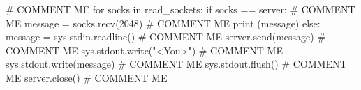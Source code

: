 \documentclass[paper=a4,fontsize=11pt]{scrartcl}%
\numberwithin{equation}{section}
\begin{document}
\begin{enumerate}
\begin{python}
 	# COMMENT ME 
    for socks in read_sockets:
        if socks == server: # COMMENT ME
            message = socks.recv(2048) # COMMENT ME
            print (message)
        else:
            message = sys.stdin.readline() # COMMENT ME
            server.send(message) # COMMENT ME
            sys.stdout.write("<You>") # COMMENT ME
            sys.stdout.write(message) # COMMENT ME
            sys.stdout.flush() # COMMENT ME
server.close() # COMMENT ME
	\end{python}
\end{enumerate}


\printbibliography
\end{document}
